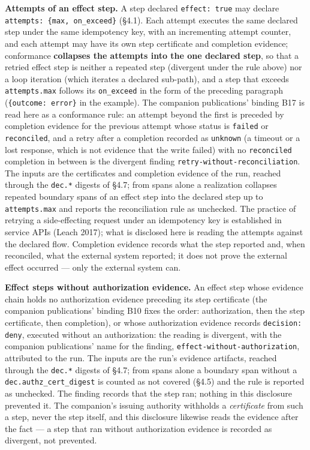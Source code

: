 \documentclass[11pt]{article}
\newcommand{\code}[1]{\texttt{#1}}
\begin{document}
\textbf{Attempts of an effect step.} A step declared \code{effect: true} may declare \code{attempts: \{max, on\_exceed\}} (\S4.1). Each attempt executes the same declared step under the same idempotency key, with an incrementing attempt counter, and each attempt may have its own step certificate and completion evidence; conformance \textbf{collapses the attempts into the one declared step}, so that a retried effect step is neither a repeated step (divergent under the rule above) nor a loop iteration (which iterates a declared sub-path), and a step that exceeds \code{attempts.max} follows its \code{on\_exceed} in the form of the preceding paragraph (\code{\{outcome: error\}} in the example). The companion publications' binding B17 is read here as a conformance rule: an attempt beyond the first is preceded by completion evidence for the previous attempt whose status is \code{failed} or \code{reconciled}, and a retry after a completion recorded as \code{unknown} (a timeout or a lost response, which is not evidence that the write failed) with no \code{reconciled} completion in between is the divergent finding \code{retry-without-reconciliation}. The inputs are the certificates and completion evidence of the run, reached through the \code{dec.*} digests of \S4.7; from spans alone a realization collapses repeated boundary spans of an effect step into the declared step up to \code{attempts.max} and reports the reconciliation rule as unchecked. The practice of retrying a side-effecting request under an idempotency key is established in service APIs (Leach 2017); what is disclosed here is reading the attempts against the declared flow. Completion evidence records what the step reported and, when reconciled, what the external system reported; it does not prove the external effect occurred --- only the external system can.

\textbf{Effect steps without authorization evidence.} An effect step whose evidence chain holds no authorization evidence preceding its step certificate (the companion publications' binding B10 fixes the order: authorization, then the step certificate, then completion), or whose authorization evidence records \code{decision: deny}, executed without an authorization: the reading is divergent, with the companion publications' name for the finding, \code{effect-without-authorization}, attributed to the run. The inputs are the run's evidence artifacts, reached through the \code{dec.*} digests of \S4.7; from spans alone a boundary span without a \code{dec.authz\_cert\_digest} is counted as not covered (\S4.5) and the rule is reported as unchecked. The finding records that the step ran; nothing in this disclosure prevented it. The companion's issuing authority withholds a \emph{certificate} from such a step, never the step itself, and this disclosure likewise reads the evidence after the fact --- a step that ran without authorization evidence is recorded as divergent, not prevented.
\end{document}
